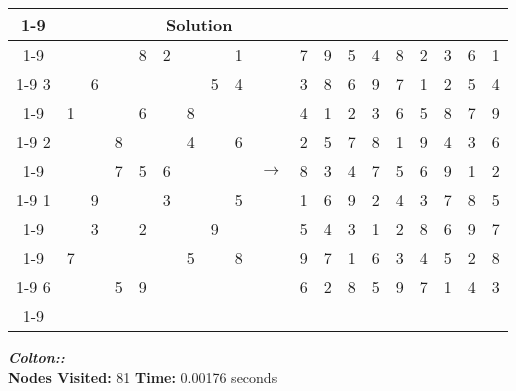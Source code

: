 \documentclass{article}
\begin{document}
\begin{tabular}{||c|c|c||c|c|c||c|c|c|| c ||c|c|c||c|c|c||c|c|c||}
  \cmidrule{1-9} \cmidrule{11-19}
  \multicolumn{9}{|c|}{Problem} &                   & \multicolumn{9}{|c|}{Solution}   \\\cmidrule{1-9} \cmidrule{11-19} \morecmidrules \cmidrule{1-9} \cmidrule{11-19}
  &   &   &   & 8 & 2 &   &   & 1 &  & 7 & 9 & 5 & 4 & 8 & 2 & 3 & 6 & 1\\\cmidrule{1-9} \cmidrule{11-19}
3 &   & 6 &   &   &   &   & 5 & 4 &  & 3 & 8 & 6 & 9 & 7 & 1 & 2 & 5 & 4\\\cmidrule{1-9} \cmidrule{11-19}
  & 1 &   &   & 6 &   & 8 &   &   &  & 4 & 1 & 2 & 3 & 6 & 5 & 8 & 7 & 9\\\cmidrule{1-9} \cmidrule{11-19} \morecmidrules \cmidrule{1-9} \cmidrule{11-19}
2 &   &   & 8 &   &   & 4 &   & 6 &  & 2 & 5 & 7 & 8 & 1 & 9 & 4 & 3 & 6\\\cmidrule{1-9} \cmidrule{11-19}
  &   &   & 7 & 5 & 6 &   &   &   & $\rightarrow$ & 8 & 3 & 4 & 7 & 5 & 6 & 9 & 1 & 2\\\cmidrule{1-9} \cmidrule{11-19}
1 &   & 9 &   &   & 3 &   &   & 5 &  & 1 & 6 & 9 & 2 & 4 & 3 & 7 & 8 & 5\\\cmidrule{1-9} \cmidrule{11-19} \morecmidrules \cmidrule{1-9} \cmidrule{11-19}
  &   & 3 &   & 2 &   &   & 9 &   &  & 5 & 4 & 3 & 1 & 2 & 8 & 6 & 9 & 7\\\cmidrule{1-9} \cmidrule{11-19}
  & 7 &   &   &   &   & 5 &   & 8 &  & 9 & 7 & 1 & 6 & 3 & 4 & 5 & 2 & 8\\\cmidrule{1-9} \cmidrule{11-19}
6 &   &   & 5 & 9 &   &   &   &   &  & 6 & 2 & 8 & 5 & 9 & 7 & 1 & 4 & 3\\\cmidrule{1-9} \cmidrule{11-19} \morecmidrules \cmidrule{1-9} \cmidrule{11-19}

\end{tabular}
\newpage
\small\emph{\textbf{Colton::}}\\ \textbf{Nodes Visited:} 81 \textbf{Time:} 0.00176 seconds\\
\end{document}
